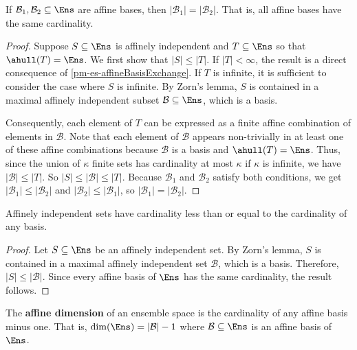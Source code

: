 \begin{mathSection}
\begin{prop}
	If $\mathcal{B}_1, \mathcal{B}_2 \subseteq \Ens$ are affine bases, then $|\mathcal{B}_1| = |\mathcal{B}_2|$. That is, all affine bases have the same cardinality.
\end{prop}

\begin{proof}
	Suppose $S \subseteq \Ens$ is affinely independent and $T \subseteq \Ens$ so that $\ahull(T) = \Ens$. We first show that $|S| \le |T|$. If $|T| < \infty$, the result is a direct consequence of \ref{pm-es-affineBasisExchange}. If $T$ is infinite, it is sufficient to consider the case where $S$ is infinite. By Zorn's lemma, $S$ is contained in a maximal affinely independent subset $\mathcal{B} \subseteq \Ens$, which is a basis.
	
	Consequently, each element of $T$ can be expressed as a finite affine combination of elements in $\mathcal{B}$. Note that each element of $\mathcal{B}$ appears non-trivially in at least one of these affine combinations because $\mathcal{B}$ is a basis and $\ahull(T) = \Ens$. Thus, since the union of $\kappa$ finite sets has cardinality at most $\kappa$ if $\kappa$ is infinite, we have $|\mathcal{B}| \le |T|$. So $|S| \le |\mathcal{B}| \le |T|$. Because $\mathcal{B}_1$ and $\mathcal{B}_2$ satisfy both conditions, we get $|\mathcal{B}_1| \le |\mathcal{B}_2|$ and $|\mathcal{B}_2| \le |\mathcal{B}_1|$, so $|\mathcal{B}_1| = |\mathcal{B}_2|$.
\end{proof}

\begin{coro}
	Affinely independent sets have cardinality less than or equal to the cardinality of any basis.
\end{coro}

\begin{proof}
	Let $S \subseteq \Ens$ be an affinely independent set. By Zorn's lemma, $S$ is contained in a maximal affinely independent set $\mathcal{B}$, which is a basis. Therefore, $|S| \le |\mathcal{B}|$. Since every affine basis of $\Ens$ has the same cardinality, the result follows.
\end{proof}

\begin{defn}
	The \textbf{affine dimension} of an ensemble space is the cardinality of any affine basis minus one. That is, $\dim(\Ens) = |\mathcal{B}|-1$ where $\mathcal{B} \subseteq \Ens$ is an affine basis of $\Ens$.
\end{defn}
\end{mathSection}

